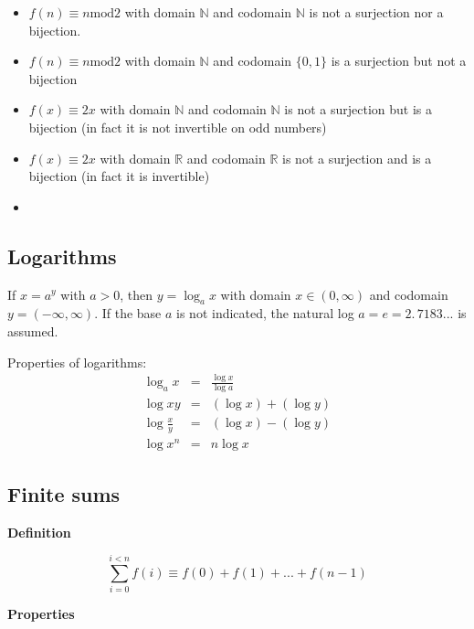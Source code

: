 \documentclass[justified, sixbynine]{tufte-book}
\def\func{\textrm}
\def\subsubsection#1{{\bf #1}}
\theoremstyle{plain}%
\newtheorem * {corollary}{Corollary}
\theoremstyle{definition}
\theoremstyle{remark}
\newtheorem * {remark}{Remark}
\newtheorem * {note}{Note}
\begin{document}
\begin{fullwidth}
\begin{itemize}
\item
$f(n)\equiv n\func{mod}2$ with domain $\mathbb{N}$ and codomain $%
\mathbb{N}$ is not a surjection nor a bijection.
\item
$f(n)\equiv n\func{mod}2$ with domain $\mathbb{N}$ and codomain $%
\{0, 1\}$ is a surjection but not a bijection
\item
$f(x)\equiv 2x$ with domain $\mathbb{N}$ and codomain $\mathbb{N}$ is
not a surjection but is a bijection (in fact it is not invertible on odd
numbers)
\item
$f(x)\equiv 2x$ with domain $\mathbb{R}$ and codomain $\mathbb{R}$ is
not a surjection and is a bijection (in fact it is invertible)
\item
\end{itemize}

\goodbreak\subsection{Logarithms}

If $x=a^y$ with $a>0$, then $y=\log _ax$ with domain $x\in (0, \infty )$ and
codomain $y=(-\infty , \infty )$. If the base $a$ is not indicated, the
natural log $a=e=\allowbreak 2.\, 7183...$ is assumed.

Properties of logarithms:
\begin{eqnarray}
\log _ax &=&\frac{\log x}{\log a} \\
\log xy &=&(\log x)+(\log y) \\
\log \frac xy &=&(\log x)-(\log y) \\
\log x^n &=&n\log x
\end{eqnarray}

\goodbreak\subsection{Finite sums}

\subsubsection{Definition}

\begin{equation}
\sum_{i=0}^{i<n}f(i)\equiv f(0)+f(1)+...+f(n-1)
\end{equation}

\subsubsection{Properties}


\end{fullwidth}
\end{document}
